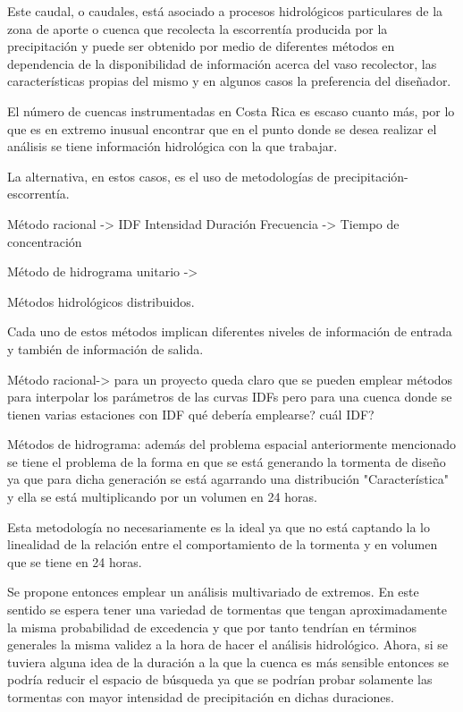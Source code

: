\documentclass[12pt]{report}
\begin{document}
Este caudal, o caudales, está asociado a procesos hidrológicos particulares de la zona de aporte o cuenca que recolecta la escorrentía producida por la precipitación y puede ser obtenido por medio de diferentes métodos en dependencia de la disponibilidad de información acerca del vaso recolector, las características propias del mismo y en algunos casos la preferencia del diseñador.

El número de cuencas instrumentadas en Costa Rica es escaso cuanto más, por lo que es en extremo inusual encontrar que en el punto donde se desea realizar el análisis se tiene información hidrológica con la que trabajar.

La alternativa, en estos casos, es el uso de metodologías de precipitación-escorrentía.

Método racional -> IDF Intensidad Duración Frecuencia
                -> Tiempo de concentración

Método de hidrograma unitario -> 

Métodos hidrológicos distribuidos.

Cada uno de estos métodos implican diferentes niveles de información de entrada y también de información de salida.

Método racional-> para un proyecto queda claro que se pueden emplear métodos para interpolar los parámetros de las curvas IDFs pero para una cuenca donde se tienen varias estaciones con IDF qué debería emplearse? cuál IDF?

Métodos de hidrograma: además del problema espacial anteriormente mencionado se tiene el problema de la forma en que se está generando la tormenta de diseño ya que para dicha generación se está agarrando una distribución "Característica" y ella se está multiplicando por un volumen en 24 horas.

Esta metodología no necesariamente es la ideal ya que no está captando la lo linealidad de la relación entre el comportamiento de la tormenta y en volumen que se tiene en 24 horas.

Se propone entonces emplear un análisis multivariado de extremos. En este sentido se espera tener una variedad de tormentas que tengan aproximadamente la misma probabilidad de excedencia y que por tanto tendrían en términos generales la misma validez a la hora de hacer el análisis hidrológico. Ahora, si se tuviera alguna idea de la duración a la que la cuenca es más sensible entonces se podría reducir el espacio de búsqueda ya que se podrían probar solamente las tormentas con mayor intensidad de precipitación en dichas duraciones.
\end{document}
